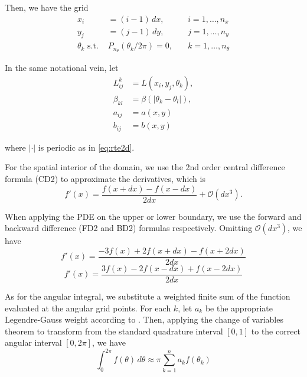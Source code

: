 \documentclass[10pt]{article}
\newcommand\abs[1]{\left| #1 \right|}
\begin{document}
\begin{multicols}{2}
Then, we have the grid
\begin{align}
	x_i &= (i-1)\,dx, &\quad i=1,\ldots,n_x \\
	y_j &= (j-1)\,dy, &\quad j=1,\ldots,n_y \\
	\theta_k \,\, \mbox{s.t.}\,\, 
	&P_{n_\theta}(\theta_k/2\pi) = 0, &\quad k=1,\ldots,n_\theta
\end{align}

In the same notational vein, let \\[-1em]
\begin{align}
	L_{ij}^k &= L(x_i,y_j,\theta_k), \\
	\beta_{kl} &= \beta(\abs{\theta_k-\theta_l}), \\
	a_{ij} &= a(x,y) \\
	b_{ij} &= b(x,y)
\end{align}

where $\abs{\cdot}$ is periodic as in \eqref{eq:rte2d}.

For the spatial interior of the domain, we use the 2nd order central difference formula (CD2) to approximate the derivatives, which is
\begin{equation}
	\tag{CD2}
	f'(x) = \frac{f(x+dx)-f(x-dx)}{2dx} + \mathcal{O}(dx^3).
\end{equation}

When applying the PDE on the upper or lower boundary, we use the forward and backward difference (FD2 and BD2) formulas respectively.
Omitting $\mathcal{O}(dx^3)$, we have
\begin{equation}
	\tag{FD2}
	\label{eq:FD2}
	f'(x) = \frac{-3f(x)+2f(x+dx)-f(x+2dx)}{2dx}
\end{equation}
\begin{equation}
	\tag{BD2}
	\label{eq:BD2}
	f'(x) = \frac{3f(x)-2f(x-dx)+f(x-2dx)}{2dx}
\end{equation}

As for the angular integral, we substitute a weighted finite sum of the function evaluated at the angular grid points.
For each $k$, let $a_k$ be the appropriate Legendre-Gauss weight according to \citet[Chapter 2]{chandrasekhar_radiative_1960}.
Then, applying the change of variables theorem to transform from the standard quadrature interval $[0,1]$ to the correct angular interval $[0,2\pi]$, we have
\begin{equation}
	\tag{LG}
	\int_0^{2\pi} f(\theta)\,d\theta \approx \pi\sum_{k=1}^n a_k f(\theta_k)
\end{equation}


\end{multicols}
\end{document}
